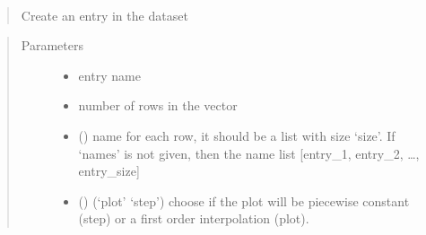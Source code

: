 \documentclass[letterpaper,10pt,english]{sphinxmanual}
\begin{document}
\begin{fulllineitems}
\begin{fulllineitems}
\begin{quote}
\begin{description}
\begin{itemize}
\end{itemize}

\end{description}\end{quote}

\end{fulllineitems}


\begin{fulllineitems}
\label{\detokenize{yaocptool.modelling:yaocptool.modelling.dataset.DataSet.create_entry}}~\begin{quote}

Create an entry in the dataset
\end{quote}
\begin{quote}\begin{description}
\item[{Parameters}] \leavevmode\begin{itemize}
\item {} 
 \textendash{} entry name

\item {} 
 \textendash{} number of rows in the vector

\item {} 
 () \textendash{} name for each row, it should be a list with size ‘size’. If ‘names’ is not given, then the
name list {[}entry\_1, entry\_2, …, entry\_size{]}

\item {} 
 () \textendash{} (‘plot’ \textbar{} ‘step’) choose if the plot will be piecewise constant (step) or a first order
interpolation (plot).

\end{itemize}

\end{description}\end{quote}

\end{fulllineitems}



\end{fulllineitems}
\end{document}

